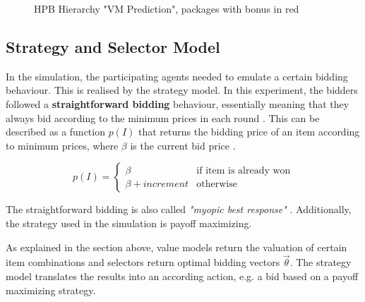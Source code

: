 \begin{figure}[]
	\centering
	
	
	\caption{HPB Hierarchy "VM Prediction", packages with bonus in red}
	\label{fig:hpb-hierarchy-vm-predict}
\end{figure}

\subsection{Strategy and Selector Model}
In the simulation, the participating agents needed to emulate a certain bidding behaviour. This is realised by the strategy model. In this experiment, the bidders followed a \textbf{straightforward bidding} behaviour, essentially meaning that they always bid according to the minimum prices in each round \cite[p. 270.]{Milgrom2000}. This can be described as a function $ p(I) $ that returns the bidding price of an item according to minimum prices, where $ \beta $ is the current bid price \cite[p. 6 ff.]{Wellman2008}.

\begin{equation}
	p(I) = 
		\begin{cases}
			\beta & \text{if item is already won} \\  
			\beta + increment & \text{otherwise}
		\end{cases} 
		\label{eq:sb-prices}
\end{equation}

The straightforward bidding is also called \textit{"myopic best response"} \cite{Brooks2000}. Additionally, the strategy used in the simulation is payoff maximizing.
 
As explained in the section above, value models return the valuation of certain item combinations and selectors return optimal bidding vectors $ \vec{\theta} $. The strategy model translates the results into an according action, e.g. a bid based on a payoff maximizing strategy.  

